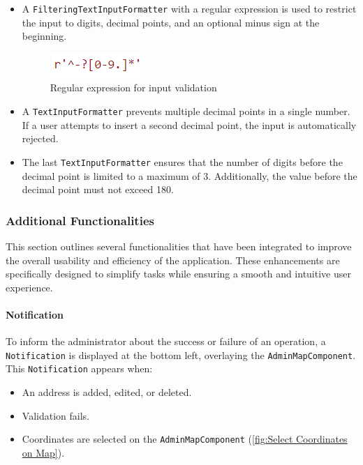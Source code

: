     \begin{itemize}
        \item A \texttt{FilteringTextInputFormatter} with a regular expression is used to restrict the input to digits, decimal points, and an optional minus sign at the beginning.
        \begin{figure}[H]
            \centering
            \includegraphics[width=0.2\linewidth]{images/AdminPanel/regexInputFormatter.png}
            \caption{Regular expression for input validation}
        \end{figure}
        \item A \texttt{TextInputFormatter} prevents multiple decimal points in a single number. If a user attempts to insert a second decimal point, the input is automatically rejected.
        \item The last \texttt{TextInputFormatter} ensures that the number of digits before the decimal point is limited to a maximum of 3. Additionally, the value before the decimal point must not exceed 180.
    \end{itemize}
    
\newpage


\subsubsection{Additional Functionalities}
    This section outlines several functionalities that have been integrated to improve the overall usability and efficiency of the application. These enhancements are specifically designed to simplify tasks while ensuring a smooth and intuitive user experience.

\paragraph{Notification}
\label{fig:Notification}

    To inform the administrator about the success or failure of an operation, a \texttt{Notification} is displayed at the bottom left, overlaying the \texttt{AdminMapComponent}. This \texttt{Notification} appears when:

    \begin{itemize}
        \item An address is added, edited, or deleted.
        \item Validation fails.
        \item Coordinates are selected on the \texttt{AdminMapComponent} (\ref{fig:Select Coordinates on Map}).
        \end{itemize}


